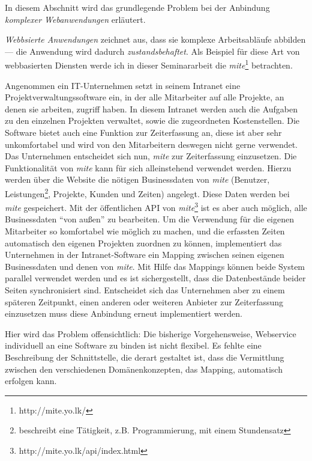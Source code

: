 In diesem Abschnitt wird das grundlegende Problem bei der Anbindung \emph{komplexer Webanwendungen} erläutert.

\bigskip

\emph{Webbsierte Anwendungen} zeichnet aus, dass sie komplexe Arbeitsabläufe abbilden --- die Anwendung wird dadurch \emph{zustandsbehaftet}. Als Beispiel für diese Art von webbasierten Diensten werde ich in dieser Seminararbeit die \emph{mite}\footnote{http://mite.yo.lk/} betrachten. 

Angenommen ein IT-Unternehmen setzt in seinem Intranet eine Projektverwaltungssoftware ein, in der alle Mitarbeiter auf alle Projekte, an denen sie arbeiten, zugriff haben. In diesem Intranet werden auch die Aufgaben zu den einzelnen Projekten verwaltet, sowie die zugeordneten Kostenstellen. Die Software bietet auch eine Funktion zur Zeiterfassung an, diese ist aber sehr unkomfortabel und wird von den Mitarbeitern deswegen nicht gerne verwendet. Das Unternehmen entscheidet sich nun, \emph{mite} zur Zeiterfassung einzusetzen. Die Funktionalität von \emph{mite} kann für sich alleinstehend verwendet werden. Hierzu werden über die Website die nötigen Businessdaten von \emph{mite} (Benutzer, Leistungen\footnote{beschreibt eine Tätigkeit, z.B. Programmierung, mit einem Stundensatz}, Projekte, Kunden und Zeiten) angelegt. Diese Daten werden bei \emph{mite} gespeichert. Mit der öffentlichen \ac{API} von \emph{mite}\footnote{http://mite.yo.lk/api/index.html} ist es aber auch möglich, alle Businessdaten "`von außen"' zu bearbeiten. Um die Verwendung für die eigenen Mitarbeiter so komfortabel wie möglich zu machen, und die erfassten Zeiten automatisch den eigenen Projekten zuordnen zu können, implementiert das Unternehmen in der Intranet-Software ein Mapping zwischen seinen eigenen Businessdaten und denen von \emph{mite}. Mit Hilfe das Mappings können beide System parallel verwendet werden und es ist sichergestellt, dass die Datenbestände beider Seiten synchronisiert sind. Entscheidet sich das Unternehmen aber zu einem späteren Zeitpunkt, einen anderen oder weiteren Anbieter zur Zeiterfassung einzusetzen muss diese Anbindung erneut implementiert werden.

Hier wird das Problem offensichtlich: Die bisherige Vorgehensweise, Webservice individuell an eine Software zu binden ist nicht flexibel. Es fehlte eine Beschreibung der Schnittstelle, die derart gestaltet ist, dass die Vermittlung zwischen den verschiedenen Domänenkonzepten, das Mapping, automatisch erfolgen kann.

